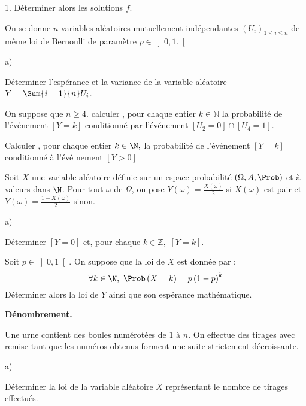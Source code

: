 \documentclass[11pt]{article}%
\begin{document}
\begin{noliste}{1.}
  Déterminer alors les solutions $f$.

\item On se donne $n$ variables aléatoires mutuellement indépendantes
  $\left( U_{i}\right) _{1\leq i\leq n}$ de même loi de Bernoulli de
  paramètre $p\in \left] 0,1.\right[ $

  \begin{noliste}{a)}
  \item Déterminer l'espérance et la variance de la variable aléatoire
    $Y = \Sum{i=1}{n}U_{i}$.

  \item On suppose que $n\geq 4.$ calculer , pour chaque entier $k\in
    \mathbb{N}$ la probabilité de l'événement $\left[ Y=k\right] $
    conditionné par l'événement $\left[ U_{2}=0\right] \cap \left[
      U_{4}=1 \right]$.

  \item Calculer , pour chaque entier $k\in \N,$ la probabilité de
    l'événement $\left[ Y=k\right] $ conditionné à l'évé%
    nement $\left[ Y>0\right] $
  \end{noliste}

\item Soit $X$ une variable aléatoire définie sur un espace
  probabilité $\left( \Omega ,A,\Prob\right) $ et à valeurs dans
  $\N$. Pour tout $\omega $ de $\Omega $, on pose $Y\left( \omega
  \right) =\frac{X\left( \omega \right) }{2}$ si $X\left( \omega
  \right) $ est pair et $Y\left( \omega \right) =\frac{1-X\left(
      \omega \right) }{2}$ sinon.

  \begin{noliste}{a)}
  \item Déterminer $\left[ Y=0\right] $ et, pour chaque $k\in \mathbb{Z},$ 
    $\left[ Y=k\right] .$

  \item Soit $p\in \left] 0,1\right[ .$ On suppose que la loi de $X$
    est donnée par :
    \[
    \forall k\in \N,\ \Prob\left( X=k\right) =p\left( 1-p\right)
    ^{k} 
    \]%
    Déterminer alors la loi de $Y$ ainsi que son espérance
    mathématique.
  \end{noliste}

\item \textbf{Dénombrement. }

  Une urne contient des boules numérotées de $1$ à $n$. On effectue
  des tirages avec remise tant que les numéros obtenus forment une
  suite strictement décroissante.

  \begin{noliste}{a)}
  \item Déterminer la loi de la variable aléatoire $X$ représentant le
    nombre de tirages effectués.


\end{noliste}
\end{noliste}
\end{document}
